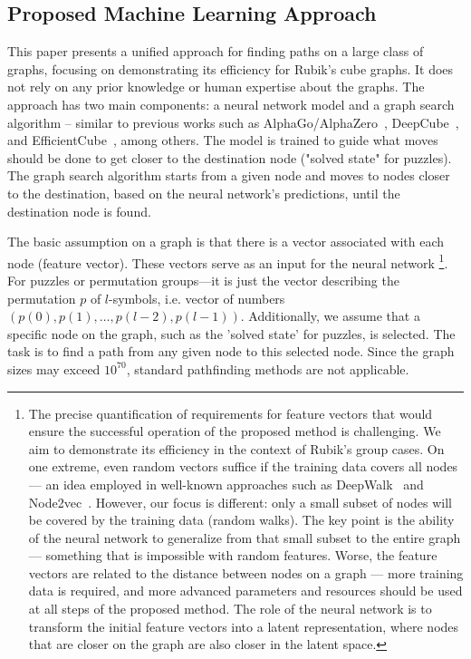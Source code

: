 
\subsection{\label{sec_approach} Proposed Machine Learning Approach}

This paper presents a unified approach for finding paths on a large class of graphs, focusing on demonstrating its efficiency for Rubik's cube graphs. It does not rely on any prior knowledge or human expertise about the graphs.
The approach has two main components: a neural network model and a graph search algorithm -- similar to previous works such as AlphaGo/AlphaZero~\cite{silver2016mastering, silver2017mastering}, DeepCube~\cite{mcaleer2019solving, agostinelli2019solving}, and EfficientCube~\cite{takano2023selfsupervision}, among others. The model is trained to guide what moves should be done to get closer to the destination node ("solved state" for puzzles). The graph search algorithm starts from a given node and moves to nodes closer to the destination, based on the neural network's predictions, until the destination node is found.

The basic assumption on a graph is that there is a vector associated with each node (feature vector). These vectors serve as an input for the neural network \footnote{The precise quantification of requirements for feature vectors that would ensure the successful operation of the proposed method is challenging. We aim to demonstrate its efficiency in the context of Rubik’s group cases. On one extreme, even random vectors suffice if the training data covers all nodes — an idea employed in well-known approaches such as DeepWalk~\cite{perozzi2014deepwalk} and Node2vec~\cite{grover2016node2vec}. However, our focus is different: only a small subset of nodes will be covered by the training data (random walks). The key point is the ability of the neural network to generalize from that small subset to the entire graph — something that is impossible with random features. Worse, the feature vectors are related to the distance between nodes on a graph --- more training data is required, and more advanced parameters and resources should be used at all steps of the proposed method. The role of the neural network is to transform the initial feature vectors into a latent representation, where nodes that are closer on the graph are also closer in the latent space. }. For puzzles or permutation groups---it is just the vector describing the permutation $p$ of $l$-symbols, i.e. vector of numbers $(p(0),p(1),\ldots,p(l-2),p(l-1))$. Additionally, we assume that a specific node on the graph, such as the 'solved state' for puzzles, is selected. The task is to find a path from any given node to this selected node. Since the graph sizes may exceed $10^{70}$, standard pathfinding methods are not applicable. 

